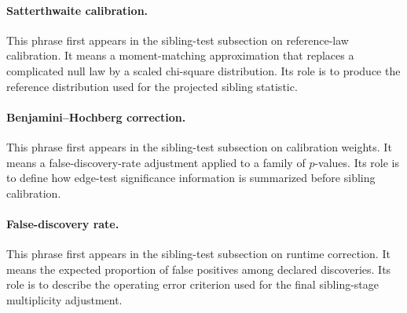 \paragraph{Satterthwaite calibration.}
This phrase first appears in the sibling-test subsection on reference-law
calibration. It means a moment-matching approximation that replaces a
complicated null law by a scaled chi-square distribution. Its role is to
produce the reference distribution used for the projected sibling statistic.

\paragraph{Benjamini--Hochberg correction.}
This phrase first appears in the sibling-test subsection on calibration
weights. It means a false-discovery-rate adjustment applied to a family of
$p$-values. Its role is to define how edge-test significance information is
summarized before sibling calibration.

\paragraph{False-discovery rate.}
This phrase first appears in the sibling-test subsection on runtime correction.
It means the expected proportion of false positives among declared discoveries.
Its role is to describe the operating error criterion used for the final
sibling-stage multiplicity adjustment.
